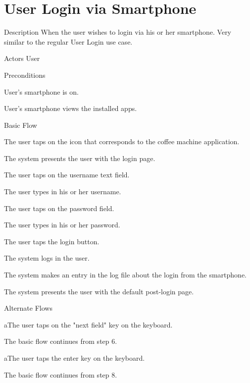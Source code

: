 \section{User Login via Smartphone}

\begin{cpart}{Description}
When the user wishes to login via his or her smartphone. Very similar to the regular User Login use case.
\end{cpart}

\begin{cpart}{Actors}
User
\end{cpart}

\begin{cpartList}{Preconditions}
\item User's smartphone is on.
\item User's smartphone views the installed apps.
\end{cpartList}

\begin{cpartList}{Basic Flow}
\item The user taps on the icon that corresponds to the coffee machine application.
\item The system presents the user with the login page.
\item The user taps on the username text field.
\item The user types in his or her username.
\item The user taps on the password field.
\item The user types in his or her password.
\item The user taps the login button.
\item The system logs in the user.
\item The system makes an entry in the log file about the login from the smartphone.
\item The system presents the user with the default post-login page.
\end{cpartList}

\begin{cpartList}{Alternate Flows}
\begin{innerList}{5}{a}{The user taps on the "next field" key on the keyboard.}
\item The basic flow continues from step 6.
\end{innerList}
\begin{innerList}{7}{a}{The user taps the enter key on the keyboard.}
\item The basic flow continues from step 8.
\end{innerList}
\end{cpartList}

